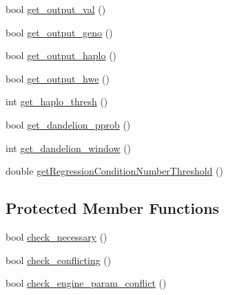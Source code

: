 \begin{DoxyCompactItemize}
\item 
bool \hyperlink{classEngineParamReader_abb93491da0bbba648a51ff2f785b6513}{get\_\-output\_\-val} ()
\item 
bool \hyperlink{classEngineParamReader_a0e8c6905841556a37fdaa536d3067cfb}{get\_\-output\_\-geno} ()
\item 
bool \hyperlink{classEngineParamReader_a70a565ae28a5c9fdc927dcdf7a43024b}{get\_\-output\_\-haplo} ()
\item 
bool \hyperlink{classEngineParamReader_a84cb9683c21d88007a5cb730ec670730}{get\_\-output\_\-hwe} ()
\item 
int \hyperlink{classEngineParamReader_ace42820941952d215dd2648794b95187}{get\_\-haplo\_\-thresh} ()
\item 
bool \hyperlink{classEngineParamReader_a0a165af1235bfe522dae1217821748f7}{get\_\-dandelion\_\-pprob} ()
\item 
int \hyperlink{classEngineParamReader_a278f819c297b3f62457823ceb0c69a94}{get\_\-dandelion\_\-window} ()
\item 
double \hyperlink{classEngineParamReader_ade1f5ccf0bd5c7cb748ca66fd332cbd0}{getRegressionConditionNumberThreshold} ()
\end{DoxyCompactItemize}
\subsection*{Protected Member Functions}
\begin{DoxyCompactItemize}
\item 
bool \hyperlink{classEngineParamReader_a4708b88a7e4708c648a82b1374b1f2b8}{check\_\-necessary} ()
\item 
bool \hyperlink{classEngineParamReader_ae7836fec858ebba41351511bc3fd0147}{check\_\-conflicting} ()
\item 
bool \hyperlink{classEngineParamReader_a99bed4b33c7cec3662413e3d049adc4c}{check\_\-engine\_\-param\_\-conflict} ()
\end{DoxyCompactItemize}
